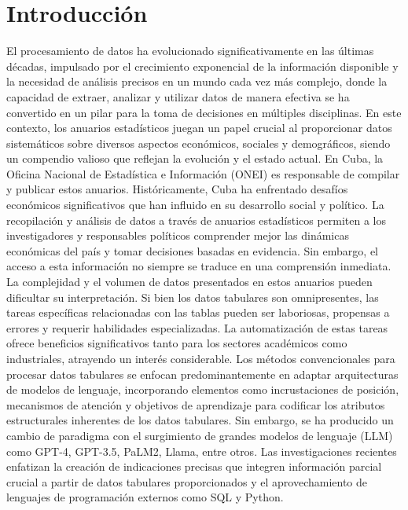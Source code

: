 \chapter*{Introducción}
\label{chap:introduccion}

El procesamiento de datos ha evolucionado significativamente en las últimas décadas, impulsado por el crecimiento exponencial de la información disponible y la necesidad de análisis precisos en un mundo cada vez más complejo, donde la capacidad de extraer, analizar y utilizar datos de manera efectiva se ha convertido en un pilar para la toma de decisiones en múltiples disciplinas. En este contexto, los anuarios estadísticos juegan un papel crucial al proporcionar datos sistemáticos sobre diversos aspectos económicos, sociales y demográficos, siendo un compendio valioso que reflejan la evolución y el estado actual. En Cuba, la Oficina Nacional de Estadística e Información (ONEI) es responsable de compilar y publicar estos anuarios.
Históricamente, Cuba ha enfrentado desafíos económicos significativos que han influido en su desarrollo social y político. La recopilación y análisis de datos a través de anuarios estadísticos permiten a los investigadores y responsables políticos comprender mejor las dinámicas económicas del país y tomar decisiones basadas en evidencia. Sin embargo, el acceso a esta información no siempre se traduce en una comprensión inmediata. La complejidad y el volumen de datos presentados en estos anuarios pueden dificultar su interpretación.
Si bien los datos tabulares son omnipresentes, las tareas específicas relacionadas con las tablas pueden ser laboriosas, propensas a errores y requerir habilidades especializadas. La automatización de estas tareas ofrece beneficios significativos tanto para los sectores académicos como industriales, atrayendo un interés considerable. Los métodos convencionales para procesar datos tabulares se enfocan predominantemente en adaptar arquitecturas de modelos de lenguaje, incorporando elementos como incrustaciones de posición, mecanismos de atención y objetivos de aprendizaje para codificar los atributos estructurales inherentes de los datos tabulares. Sin embargo, se ha producido un cambio de paradigma con el surgimiento de grandes modelos de lenguaje (LLM) como GPT-4, GPT-3.5, PaLM2, Llama, entre otros. Las investigaciones recientes enfatizan la creación de indicaciones precisas que integren información parcial crucial a partir de datos tabulares proporcionados y el aprovechamiento de lenguajes de programación externos como SQL y Python. 
